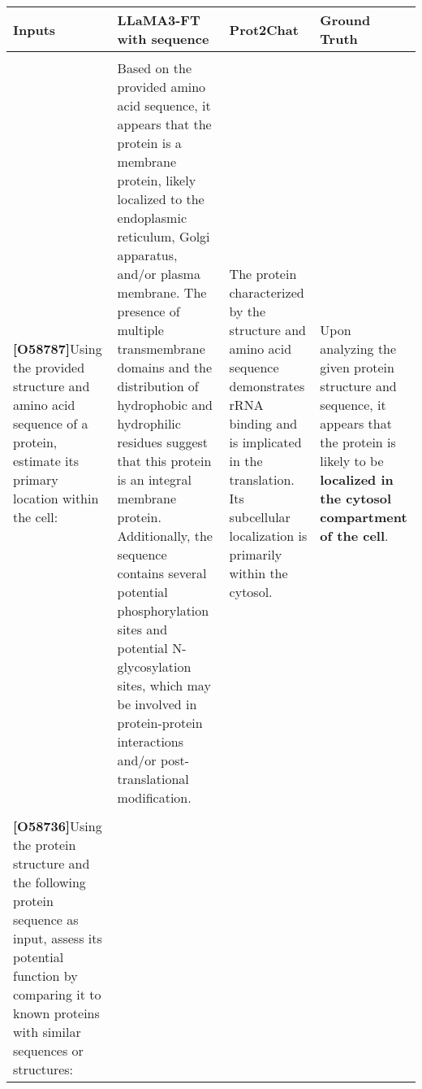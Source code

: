 \begin{table*}[t]
    \centering
    \renewcommand{\arraystretch}{2} 
    \begin{tabular}{m{}|m{}|m{}|m{}}
        \hline
        Inputs & LLaMA3-FT with sequence & Prot2Chat & Ground Truth \\
        \hline
        \begin{minipage}[c][0.1\textwidth][c]{0.2\textwidth}
            \begin{center}
            
            \texttt{[image: location.png]} \\
            \textbf{[O58787]}Using the provided structure and amino acid sequence of a protein, estimate its primary location within the cell: 
            \end{center}
        \end{minipage} & Based on the provided amino acid sequence, it appears that the protein is a membrane protein, likely \color{red}localized to the endoplasmic reticulum, Golgi apparatus, and/or plasma membrane.\color{black} The presence of multiple transmembrane domains and the distribution of hydrophobic and hydrophilic residues suggest that \color{red}this protein is an integral membrane protein.\color{black} Additionally, the sequence contains several potential phosphorylation sites and potential N-glycosylation sites, which may be involved in protein-protein interactions and/or post-translational modification. & The protein characterized by the structure and amino acid sequence demonstrates rRNA binding and is implicated in the translation. Its subcellular \color{blue}localization is primarily within the cytosol. & Upon analyzing the given protein structure and sequence, it appears that the protein is likely to be \textbf{localized in the cytosol compartment of the cell}. \\
        \hline
        \begin{minipage}[c][0.01\textwidth][c]{0.2\textwidth} 
            \centering
            \texttt{[image: function.png]} \\
            \textbf{[O58736]}Using the protein structure and the following protein sequence as input, assess its potential function by comparing it to known proteins with similar sequences or structures: 

\end{minipage}
\end{tabular}
\end{table*}
